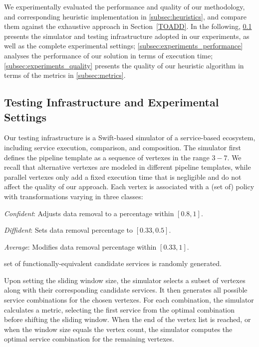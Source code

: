 We experimentally evaluated the performance and quality of our methodology,
and corresponding heuristic implementation in \cref{subsec:heuristics},
and compare them against the exhaustive approach in Section~\ref{TOADD}.
In the following,
\cref{subsec:experiments_infrastructure} presents the simulator and testing infrastructure adopted in our experiments, as well as the complete experimental settings; \cref{subsec:experiments_performance} analyses the performance of our solution in terms of execution time; \cref{subsec:experiments_quality} presents the quality of our heuristic algorithm in terms of the metrics in \cref{subsec:metrics}.

\subsection{Testing Infrastructure and Experimental Settings}\label{subsec:experiments_infrastructure}
Our testing infrastructure is a Swift-based simulator of a service-based ecosystem, including service execution, comparison, and composition.
The simulator first defines the pipeline template as a sequence of vertexes in the range $3-7$.
We recall that alternative vertexes are modeled in different pipeline templates,
while parallel vertexes only add a fixed execution time that is negligible and do not affect the quality of our approach.
Each vertex is associated with a (set of) policy with transformations varying in three classes:

\begin{itemize*}[label=roman*]
  \item \textit{Confident}: Adjusts data removal to a percentage within $[0.8,1]$.
  \item \textit{Diffident}: Sets data removal percentage to $[0.33,0.5]$.
  \item \textit{Average}: Modifies data removal percentage within $[0.33,1]$.
\end{itemize*}
set of functionally-equivalent candidate services is randomly generated.

Upon setting the sliding window size, the simulator selects a subset of vertexes along with their corresponding candidate services.
It then generates all possible service combinations for the chosen vertexes.
For each combination, the simulator calculates a metric, selecting the first service from the optimal combination before shifting the sliding window.
When the end of the vertex list is reached, or when the window size equals the vertex count, the simulator computes the optimal service combination for the remaining vertexes.


